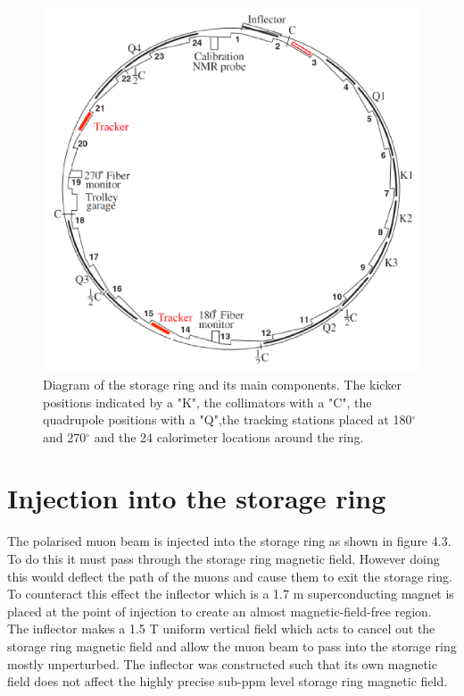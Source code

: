 \begin{figure}[th]
\centering
\includegraphics{Figures/ringcomponents}
\decoRule
\caption{Diagram of the storage ring and its main components. The kicker positions indicated by a "K", the collimators with a "C", the quadrupole positions with a "Q",the tracking stations placed at 180$^\circ$ and 270$^\circ$ and the 24 calorimeter locations around the ring.}
\label{fig:ringcomponents}
\end{figure}

\section{Injection into the storage ring}

The polarised muon beam is injected into the storage ring as shown in figure 4.3. To do this it must pass through the storage ring magnetic field. However doing this would deflect the path of the muons and cause them to exit the storage ring. To counteract this effect the inflector which is a 1.7 m superconducting magnet is placed at the point of injection to create an almost magnetic-field-free region. The inflector makes a 1.5 T uniform vertical field which acts to cancel out the storage ring magnetic field and allow the muon beam to pass into the storage ring mostly unperturbed. The inflector was constructed such that its own magnetic field does not affect the highly precise sub-ppm level storage ring magnetic field.

